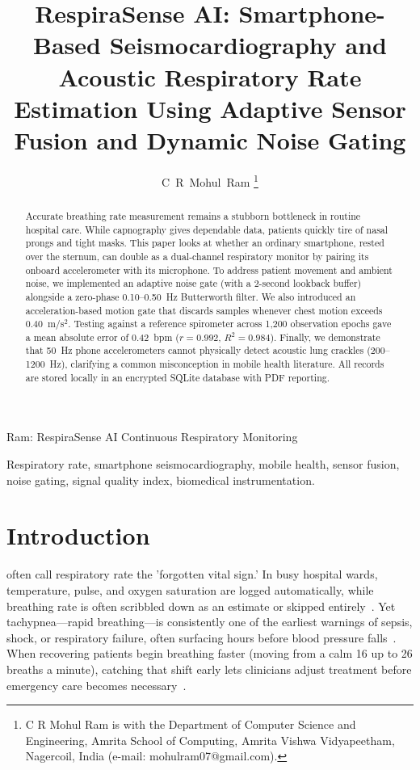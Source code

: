 \documentclass[journal]{IEEEtran}
\begin{document}
\title{RespiraSense AI: Smartphone-Based Seismocardiography and Acoustic Respiratory Rate Estimation Using Adaptive Sensor Fusion and Dynamic Noise Gating}

\author{C~R~Mohul~Ram%
\thanks{C R Mohul Ram is with the Department of Computer Science and Engineering, Amrita School of Computing, Amrita Vishwa Vidyapeetham, Nagercoil, India (e-mail: mohulram07@gmail.com).}%
}

%
{Ram: RespiraSense AI Continuous Respiratory Monitoring}

\maketitle

\begin{abstract}
Accurate breathing rate measurement remains a stubborn bottleneck in routine hospital care. While capnography gives dependable data, patients quickly tire of nasal prongs and tight masks. This paper looks at whether an ordinary smartphone, rested over the sternum, can double as a dual-channel respiratory monitor by pairing its onboard accelerometer with its microphone. To address patient movement and ambient noise, we implemented an adaptive noise gate (with a 2-second lookback buffer) alongside a zero-phase 0.10--0.50~Hz Butterworth filter. We also introduced an acceleration-based motion gate that discards samples whenever chest motion exceeds 0.40~m/s$^2$. Testing against a reference spirometer across 1,200 observation epochs gave a mean absolute error of 0.42~bpm ($r = 0.992$, $R^2 = 0.984$). Finally, we demonstrate that 50~Hz phone accelerometers cannot physically detect acoustic lung crackles (200--1200~Hz), clarifying a common misconception in mobile health literature. All records are stored locally in an encrypted SQLite database with PDF reporting.
\end{abstract}

\begin{IEEEkeywords}
Respiratory rate, smartphone seismocardiography, mobile health, sensor fusion, noise gating, signal quality index, biomedical instrumentation.
\end{IEEEkeywords}

\section{Introduction}
 often call respiratory rate the 'forgotten vital sign.' In busy hospital wards, temperature, pulse, and oxygen saturation are logged automatically, while breathing rate is often scribbled down as an estimate or skipped entirely~\cite{cretikos2008}. Yet tachypnea—rapid breathing—is consistently one of the earliest warnings of sepsis, shock, or respiratory failure, often surfacing hours before blood pressure falls~\cite{subbe2003, pimentel2017}. When recovering patients begin breathing faster (moving from a calm 16 up to 26 breaths a minute), catching that shift early lets clinicians adjust treatment before emergency care becomes necessary~\cite{liu2021}.
\end{document}
